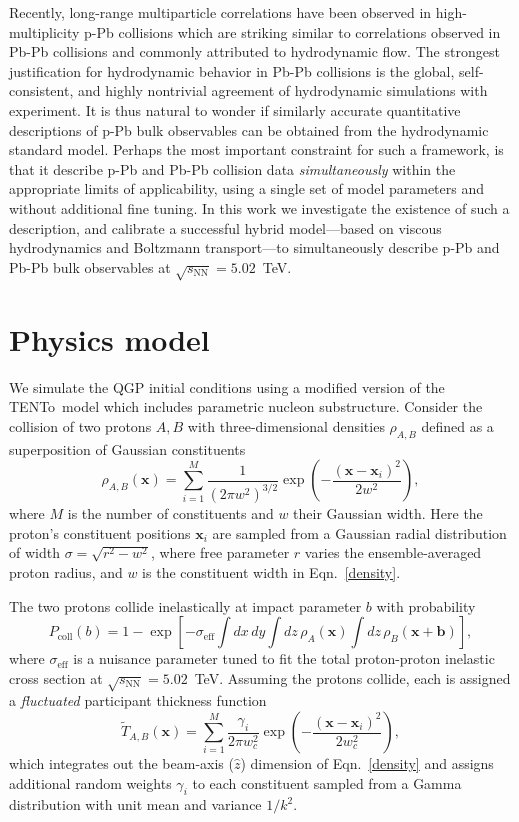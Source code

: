 \documentclass[3p,times,procedia,sort&compress]{elsarticle}
\newcommand{\trento}{T\raisebox{-0.3ex}{R}ENTo}
\newcommand{\sqrts}{\sqrt{s_\mathrm{NN}}}
\newcommand{\T}{\tilde{T}}
\begin{document}
Recently, long-range multiparticle correlations have been observed in high-multiplicity p-Pb collisions which are striking similar to correlations observed in Pb-Pb collisions and commonly attributed to hydrodynamic flow.
The strongest justification for hydrodynamic behavior in Pb-Pb collisions is the global, self-consistent, and highly nontrivial agreement of hydrodynamic simulations with experiment.
It is thus natural to wonder if similarly accurate quantitative descriptions of p-Pb bulk observables can be obtained from the hydrodynamic standard model.
Perhaps the most important constraint for such a framework, is that it describe p-Pb and Pb-Pb collision data \emph{simultaneously} within the appropriate limits of applicability, using a single set of model parameters and without additional fine tuning.
In this work we investigate the existence of such a description, and calibrate a successful hybrid model---based on viscous hydrodynamics and Boltzmann transport---to simultaneously describe p-Pb and Pb-Pb bulk observables at $\sqrts=5.02$~TeV.

\section{Physics model}

We simulate the QGP initial conditions using a modified version of the \trento\ model \cite{Moreland:2014oya} which includes parametric nucleon substructure.
Consider the collision of two protons $A, B$ with three-dimensional densities $\rho_{A,B}$ defined as a superposition of Gaussian constituents
\begin{equation}
  \label{density}
  \rho_{A,B}(\textbf{x}) = \sum\limits_{i=1}^{M} \frac{1}{(2 \pi w^2)^{3/2}} \exp\left(-\frac{(\textbf{x}-\textbf{x}_i)^2}{2 w^2}\right),
\end{equation}
where $M$ is the number of constituents and $w$ their Gaussian width.
Here the proton's constituent positions $\textbf{x}_i$ are sampled from a Gaussian radial distribution of width $\sigma = \sqrt{r^2 - w^2}$, where free parameter $r$ varies the ensemble-averaged proton radius, and $w$ is the constituent width in Eqn.~\eqref{density}.

The two protons collide inelastically at impact parameter $b$ with probability
\begin{equation}
  \label{pcoll}
  P_\text{coll}(b) = 1 - \exp\left[-\sigma_\text{eff} \int dx\,dy \int dz\, \rho_A(\mathbf{x}) \int dz\, \rho_B(\mathbf{x} + \mathbf{b}) \right],
\end{equation}
where $\sigma_\text{eff}$ is a nuisance parameter tuned to fit the total proton-proton inelastic cross section at \mbox{$\sqrts=5.02$~TeV}.
Assuming the protons collide, each is assigned a \emph{fluctuated} participant thickness function
\begin{equation}
  \label{part}
  \T_{A,B}(\mathbf{x}) = \sum\limits_{i=1}^{M} \frac{\gamma_i}{2 \pi w_c^2} \exp\left(-\frac{(\textbf{x}-\textbf{x}_i)^2}{2 w_c^2}\right),
\end{equation}
which integrates out the beam-axis ($\hat{z}$) dimension of Eqn.~\eqref{density} and assigns additional random weights $\gamma_i$ to each constituent sampled from a Gamma distribution with unit mean and variance $1/k^2$.
\end{document}
